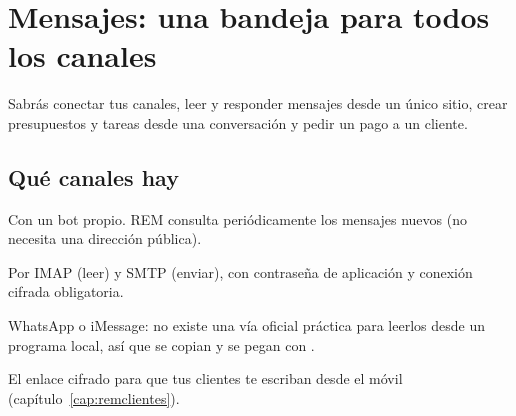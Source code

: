 \chapter{Mensajes: una bandeja para todos los canales}\label{cap:mensajes}

\begin{objbox}
Sabrás conectar tus canales, leer y responder mensajes desde un único sitio, crear presupuestos y tareas desde una conversación y pedir un pago a un cliente.
\end{objbox}

\section{Qué canales hay}
\begin{description}[leftmargin=0.6cm,style=nextline]
\item[Telegram.] Con un bot propio. REM consulta periódicamente los mensajes nuevos (no necesita una dirección pública).
\item[Correo.] Por IMAP (leer) y SMTP (enviar), con contraseña de aplicación y conexión cifrada obligatoria.
\item[Mensajes pegados.] WhatsApp o iMessage: no existe una vía oficial práctica para leerlos desde un programa local, así que se copian y se pegan con .
\item[REM Clientes.] El enlace cifrado para que tus clientes te escriban desde el móvil (capítulo~\ref{cap:remclientes}).
\end{description}

